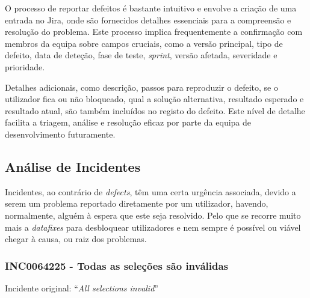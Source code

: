         O processo de reportar defeitos é bastante intuitivo e envolve a criação de uma entrada no Jira, onde são fornecidos detalhes essenciais para a compreensão e resolução do problema. Este processo implica frequentemente a confirmação com membros da equipa sobre campos cruciais, como a versão principal, tipo de defeito, data de deteção, fase de teste, \textit{sprint}, versão afetada, severidade e prioridade.

        Detalhes adicionais, como descrição, passos para reproduzir o defeito, se o utilizador fica ou não bloqueado, qual a solução alternativa, resultado esperado e resultado atual, são também incluídos no registo do defeito. Este nível de detalhe facilita a triagem, análise e resolução eficaz por parte da equipa de desenvolvimento futuramente.



    \subsection{Análise de Incidentes}\label{sub:incidentes}

        Incidentes, ao contrário de \textit{defects}, têm uma certa urgência associada, devido a serem um problema reportado diretamente por um utilizador, havendo, normalmente, alguém à espera que este seja resolvido. Pelo que se recorre muito mais a \textit{datafixes} para desbloquear utilizadores e nem sempre é possível ou viável chegar à causa, ou raiz dos problemas.


        \subsubsection{INC0064225 - Todas as seleções são inválidas}\label{secsec:inc0064225} %

            Incidente original: ``\textit{All selections invalid}''


